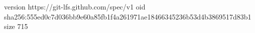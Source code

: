 version https://git-lfs.github.com/spec/v1
oid sha256:555ed0c7d036bb9e60a85fb1f4a261971ae18466345236b53d4b3869517d83b1
size 715
